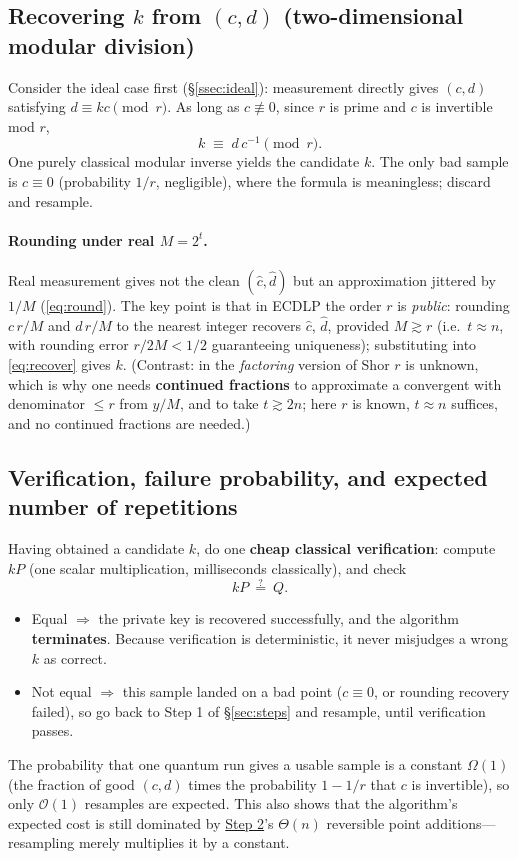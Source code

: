 \documentclass[11pt]{article}
\newcommand{\secref}[1]{\hyperref[#1]{\S\ref*{#1}}}
\begin{document}
\subsection{Recovering $k$ from $(c,d)$ (two-dimensional modular division)}

Consider the ideal case first (\secref{ssec:ideal}): measurement directly gives $(c,d)$ satisfying $d\equiv kc\pmod r$. As long as $c\not\equiv 0$, since $r$ is
prime and $c$ is invertible mod $r$,
\begin{equation}
k\;\equiv\;d\,c^{-1}\pmod r .
\label{eq:recover}
\end{equation}
One purely classical modular inverse yields the candidate $k$. The only bad sample is $c\equiv 0$ (probability $1/r$, negligible), where the formula is meaningless; discard and resample.

\paragraph{Rounding under real $M=2^t$.}\label{ssec:cf}
Real measurement gives not the clean $(\hat c,\hat d)$ but an approximation jittered by $1/M$ (\eqref{eq:round}). The key point is that in ECDLP the order $r$ is
\emph{public}: rounding $c\,r/M$ and $d\,r/M$ to the nearest integer recovers $\hat c$, $\hat d$, provided $M\gtrsim r$ (i.e.\ $t\approx n$, with rounding
error $r/2M<1/2$ guaranteeing uniqueness); substituting into \eqref{eq:recover} gives $k$. (Contrast: in the \emph{factoring} version of Shor $r$ is unknown, which is why one needs
\textbf{continued fractions} to approximate a convergent with denominator $\le r$ from $y/M$, and to take $t\gtrsim 2n$; here $r$ is known, $t\approx n$ suffices, and no continued fractions are needed.)

\subsection{Verification, failure probability, and expected number of repetitions}

Having obtained a candidate $k$, do one \textbf{cheap classical verification}: compute $kP$ (one scalar multiplication, milliseconds classically), and check
\[
kP\ \stackrel{?}{=}\ Q .
\]
\begin{itemize}[leftmargin=1.4em]
\item Equal $\Rightarrow$ the private key is recovered successfully, and the algorithm \textbf{terminates}. Because verification is deterministic, it never misjudges a wrong $k$ as correct.
\item Not equal $\Rightarrow$ this sample landed on a bad point ($c\equiv 0$, or rounding recovery failed), so go back to Step 1 of \secref{sec:steps} and resample,
until verification passes.
\end{itemize}
The probability that one quantum run gives a usable sample is a constant $\Omega(1)$ (the fraction of good $(c,d)$ times the probability $1-1/r$ that $c$ is invertible), so only
$\mathcal{O}(1)$ resamples are expected. This also shows that the algorithm's expected cost is still dominated by \hyperref[step:eval]{Step 2}'s $\Theta(n)$ reversible point additions---resampling merely multiplies it
by a constant.
\end{document}

